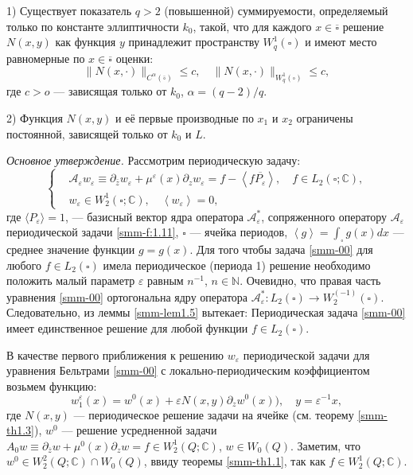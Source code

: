 \documentclass[a4paper,12pt]{article}
\theoremstyle{definition}
\def\<{\left<}
\def\>{\right>}
\begin{document}
	1) Существует показатель $q>2$ (повышенной) суммируемости, определяемый только по константе эллиптичности $k_0$, такой, что  для каждого $x\in\overline\square$ решение $N(x,y)$ как функция $y$ принадлежит пространству $W_q^1(\square)$ и имеют место равномерные по $x\in\overline\square$ оценки:
	$$
	\|N(x,\cdot)\|_{C^\alpha(\overline\square)}\leqslant c,\quad \|N(x,\cdot)\|_{W_q^1(\square)}\leqslant c,
	$$
	где $c>o$ --- зависящая только от $k_0$, $\alpha=(q-2)/q$.
	
	2) Функция $N(x,y)$ и её первые производные по $x_1$ и $x_2$ ограничены постоянной,
	зависящей только от $k_0$ и $L$.
	
	\textit{Основное утверждение.}
	Рассмотрим периодическую задачу:
	\begin{equation}\label{smm-00}
	\left\{\begin{aligned}
	&\mathscr{A}_\varepsilon w_\varepsilon\equiv \partial_{\bar{z}}w_\varepsilon +\mu^\varepsilon(x) \partial_{z}w_\varepsilon =f-\<f\overline{P_\varepsilon}\>,\quad f\in L_2(\square;\mathbb{C}),\\
	&w_\varepsilon\in W_2^1(\square;\mathbb{C}),	\quad \<w_\varepsilon\>=0,
	\end{aligned}\right.	
	\end{equation}
	   		где $\langle P_\varepsilon\rangle=1$, --- базисный вектор ядра оператора $\mathscr{A}_\varepsilon^\ast$, сопряженного оператору $\mathscr{A}_\varepsilon$ периодической задачи \eqref{smm-f:1.11}, $\square$ --- ячейка периодов, $\<g\>=\int_\square g(x)dx$ --- среднее значение функции  $g=g(x)$. Для того чтобы задача \eqref{smm-00} для любого $f\in L_2(\square)$ имела периодическое (периода 1) решение необходимо положить малый параметр $\varepsilon$ равным $n^{-1}$, $n\in \mathbb{N}$.
		Очевидно, что правая часть  уравнения  \eqref{smm-00} ортогональна ядру оператора $\mathscr{A}_\varepsilon^\ast:L_2 (\square)\to W_2^(-1) (\square)$. Следовательно, из леммы \ref{smm-lem1.5} вытекает: Периодическая задача \eqref{smm-00} имеет единственное решение для любой функции $f\in L_2(\square)$.
		
	
	В качестве первого приближения к решению $w_\varepsilon$  периодической задачи
	для уравнения Бельтрами \eqref{smm-00} с локально-периодическим коэффициентом возьмем функцию:
	$$ w_1^\varepsilon(x)=w^0(x)+\varepsilon N(x,y)\partial_zw^0(x)), \quad y=\varepsilon^{-1}x,$$
где $N(x,y)$  --- периодическое решение задачи на ячейке (см. теорему \ref{smm-th1.3}), $w^0$ --- решение усредненной задачи $A_0w\equiv\partial_{\overline{z}}w+\mu^0(x)\partial_zw=f\in W_2^1(Q;\mathbb{C})$, $w\in W_0(Q)$. Заметим, что $w^0\in W_2^2(Q;\mathbb{C})\cap W_0(Q)$, ввиду 	теоремы \ref{smm-th1.1}, так как $f\in W_2^1(Q;\mathbb{C})$.
	
\end{document}
